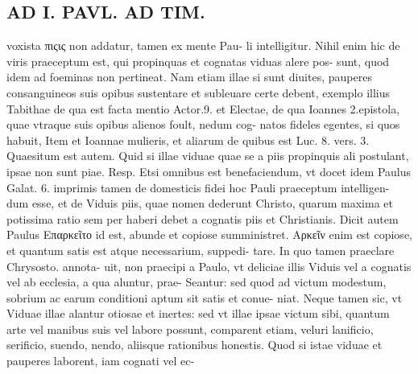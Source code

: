 \documentclass{article}
\begin{document}
\begin{pages}
\section*{AD I. PAVL. AD TIM. }
\marginpar{[ p.302 ]}\pstart voxista πιςις non addatur, tamen ex mente Pau- li intelligitur. Nihil enim hic de viris praeceptum est, qui propinquas et cognatas viduas alere pos- sunt, quod idem ad foeminas non pertineat. Nam etiam illae si sunt diuites, pauperes consanguineos suis opibus sustentare et subleuare certe debent, exemplo illius Tabithae de qua est facta mentio Actor.9. et Electae, de qua Ioannes 2.epistola, quae vtraque suis opibus alienos foult, nedum cog- natos fideles egentes, si quos habuit, Item et Ioannae mulieris, et aliarum de quibus est Luc. 8. vers. 3. Quaesitum est autem. Quid si illae viduae quae se a piis propinquis ali postulant, ipsae non sunt piae. Resp. Etsi omnibus est benefaciendum, vt docet idem Paulus Galat. 6. imprimis tamen de domesticis fidei hoc Pauli praeceptum intelligen- dum esse, et de Viduis piis, quae nomen dederunt Christo, quarum maxima et potissima ratio sem per haberi debet a cognatis piis et Christianis. Dicit autem Paulus Επαρκεῖτο id est, abunde et copiose sumministret. Αρκεῖν enim est copiose, et quantum satis est atque necessarium, suppedi- tare. In quo tamen praeclare Chrysosto. annota- uit, non praecipi a Paulo, vt deliciae illis Viduis vel a cognatis vel ab ecclesia, a qua aluntur, prae- Seantur: sed quod ad victum modestum, sobrium ac earum conditioni aptum sit satis et conue- niat. Neque tamen sic, vt Viduae illae alantur otiosae et inertes: sed vt illae ipsae victum sibi, quantum arte vel manibus suis vel labore possunt, comparent etiam, veluri lanificio, serificio, suendo, nendo, aliisque rationibus honestis. Quod si istae viduae et pauperes laborent, iam cognati vel ec-  \pend

\end{pages}
\end{document}
